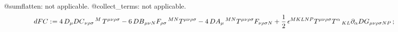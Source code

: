 \documentclass[11pt]{article}
\def\specialcolon{\mathrel{\mathop{:}}\hspace{-.5em}}
\begin{document}
@sumflatten: not applicable.
@collect\_terms: not applicable.
\begin{dmath*}[compact, spread=2pt]
dFC\specialcolon{}= 4\, {D}_{\mu}{{DC}_{\nu \rho \sigma}\,^{M}}\,  {T}^{\mu \nu \rho \sigma} - 6\, {DB}_{\mu \nu N} {F}_{\rho \sigma}\,^{M N} {T}^{\mu \nu \rho \sigma} - 4\, {DA}_{\mu}\,^{M N} {T}^{\mu \nu \rho \sigma} {F}_{\nu \rho \sigma N} + \frac{1}{2}\, {\epsilon}^{M K L N P} {T}^{\mu \nu \rho \sigma} {T}^{\alpha}\,_{K L} {\partial}_{\alpha}{{DG}_{\mu \nu \rho \sigma N P}}\, ;
\end{dmath*}
\end{document}
